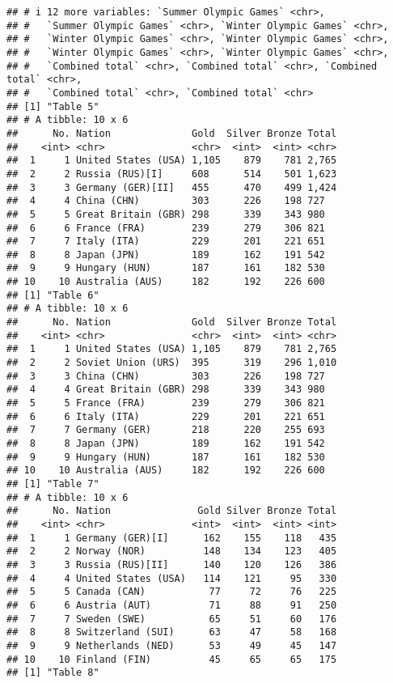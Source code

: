 \documentclass[
]{article}
\begin{document}
\begin{verbatim}
## # i 12 more variables: `Summer Olympic Games` <chr>,
## #   `Summer Olympic Games` <chr>, `Winter Olympic Games` <chr>,
## #   `Winter Olympic Games` <chr>, `Winter Olympic Games` <chr>,
## #   `Winter Olympic Games` <chr>, `Winter Olympic Games` <chr>,
## #   `Combined total` <chr>, `Combined total` <chr>, `Combined total` <chr>,
## #   `Combined total` <chr>, `Combined total` <chr>
## [1] "Table 5"
## # A tibble: 10 x 6
##      No. Nation              Gold  Silver Bronze Total
##    <int> <chr>               <chr>  <int>  <int> <chr>
##  1     1 United States (USA) 1,105    879    781 2,765
##  2     2 Russia (RUS)[I]     608      514    501 1,623
##  3     3 Germany (GER)[II]   455      470    499 1,424
##  4     4 China (CHN)         303      226    198 727  
##  5     5 Great Britain (GBR) 298      339    343 980  
##  6     6 France (FRA)        239      279    306 821  
##  7     7 Italy (ITA)         229      201    221 651  
##  8     8 Japan (JPN)         189      162    191 542  
##  9     9 Hungary (HUN)       187      161    182 530  
## 10    10 Australia (AUS)     182      192    226 600  
## [1] "Table 6"
## # A tibble: 10 x 6
##      No. Nation              Gold  Silver Bronze Total
##    <int> <chr>               <chr>  <int>  <int> <chr>
##  1     1 United States (USA) 1,105    879    781 2,765
##  2     2 Soviet Union (URS)  395      319    296 1,010
##  3     3 China (CHN)         303      226    198 727  
##  4     4 Great Britain (GBR) 298      339    343 980  
##  5     5 France (FRA)        239      279    306 821  
##  6     6 Italy (ITA)         229      201    221 651  
##  7     7 Germany (GER)       218      220    255 693  
##  8     8 Japan (JPN)         189      162    191 542  
##  9     9 Hungary (HUN)       187      161    182 530  
## 10    10 Australia (AUS)     182      192    226 600  
## [1] "Table 7"
## # A tibble: 10 x 6
##      No. Nation               Gold Silver Bronze Total
##    <int> <chr>               <int>  <int>  <int> <int>
##  1     1 Germany (GER)[I]      162    155    118   435
##  2     2 Norway (NOR)          148    134    123   405
##  3     3 Russia (RUS)[II]      140    120    126   386
##  4     4 United States (USA)   114    121     95   330
##  5     5 Canada (CAN)           77     72     76   225
##  6     6 Austria (AUT)          71     88     91   250
##  7     7 Sweden (SWE)           65     51     60   176
##  8     8 Switzerland (SUI)      63     47     58   168
##  9     9 Netherlands (NED)      53     49     45   147
## 10    10 Finland (FIN)          45     65     65   175
## [1] "Table 8"

\end{verbatim}
\end{document}
